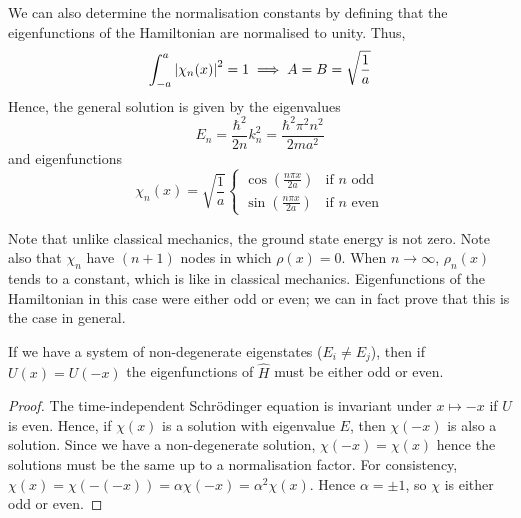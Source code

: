 We can also determine the normalisation constants by defining that the eigenfunctions of the Hamiltonian are normalised to unity.
Thus,
\[
	\int_{-a}^a \abs{\chi_n(x)}^2 = 1 \implies A = B = \sqrt{\frac{1}{a}}
\]
Hence, the general solution is given by the eigenvalues
\[
	E_n = \frac{\hbar^2}{2n} k_n^2 = \frac{\hbar^2 \pi^2 n^2}{2ma^2}
\]
and eigenfunctions
\[
	\chi_n(x) = \sqrt{\frac{1}{a}} \begin{cases}
		\cos(\frac{n \pi x}{2a}) & \text{if } n \text{ odd}  \\
		\sin(\frac{n \pi x}{2a}) & \text{if } n \text{ even}
	\end{cases}
\]
\begin{remark}
	Note that unlike classical mechanics, the ground state energy is not zero.
	Note also that \( \chi_n \) have \( (n+1) \) nodes in which \( \rho(x) = 0 \).
	When \( n \to \infty \), \( \rho_n(x) \) tends to a constant, which is like in classical mechanics.
	Eigenfunctions of the Hamiltonian in this case were either odd or even; we can in fact prove that this is the case in general.
\end{remark}
\begin{proposition}
	If we have a system of non-degenerate eigenstates (\( E_i \neq E_j \)),  then if \( U(x) = U(-x) \) the eigenfunctions of \( \hat H \) must be either odd or even.
\end{proposition}
\begin{proof}
	The time-independent Schr\"odinger equation is invariant under \( x \mapsto -x \) if \( U \) is even.
	Hence, if \( \chi(x) \) is a solution with eigenvalue \( E \), then \( \chi(-x) \) is also a solution.
	Since we have a non-degenerate solution, \( \chi(-x) = \chi(x) \) hence the solutions must be the same up to a normalisation factor.
	For consistency, \( \chi(x) = \chi(-(-x)) = \alpha \chi(-x) = \alpha^2 \chi(x) \).
	Hence \( \alpha = \pm 1 \), so \( \chi \) is either odd or even.
\end{proof}


